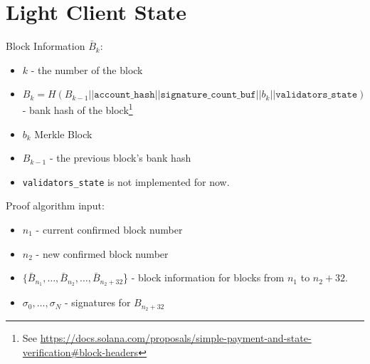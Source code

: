 \section{Light Client State}

Block Information $\bar B_k$:
\begin{itemize}
	\item $k$ - the number of the block
	\item $B_k = H(B_{k - 1} || \texttt{account\_hash} || \texttt{signature\_count\_buf} || b_k || \texttt{validators\_state})$ - bank hash of the block\footnote{See \url{https://docs.solana.com/proposals/simple-payment-and-state-verification\#block-headers}}
	\item $b_k$ Merkle Block
	\item $B_{k - 1}$ - the previous block's bank hash
	\item \texttt{validators\_state} is not implemented for now. 
\end{itemize}

Proof algorithm input:
\begin{itemize}
	\item $n_1$ - current confirmed block number
	\item $n_2$ - new confirmed block number
	\item $\{\bar B_{n_1}, \dots, \bar B_{n_2}, \dots, \bar B_{n_2 + 32}$\} - block information for blocks from $n_1$ to $n_2 + 32$.
	\item $\sigma_0, \dots, \sigma_N$ - signatures for $B_{n_2 + 32}$
\end{itemize}